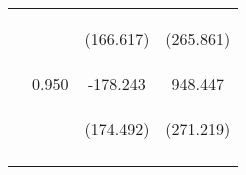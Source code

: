 \begin{tabular}{lccc}
 & \begin{footnotesize}\end{footnotesize} & \begin{footnotesize}(166.617)\end{footnotesize} & \begin{footnotesize}(265.861)\end{footnotesize}\\
\noalign{\smallskip} & 0.950 & -178.243 & 948.447\\
 & \begin{footnotesize}\end{footnotesize} & \begin{footnotesize}(174.492)\end{footnotesize} & \begin{footnotesize}(271.219)\end{footnotesize}\\
\noalign{\smallskip}\hline\end{tabular}\\
